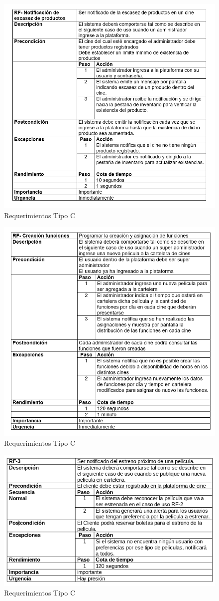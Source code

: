 \begin{figure}[h!]
\centering
\includegraphics[width=.8\linewidth]{diseno/requerimientos/imgs/casos1}
	\caption{Requerimientos Tipo C}
\end{figure}
\newpage
\begin{figure}[h!]
\centering
\includegraphics[width=.8\linewidth]{diseno/requerimientos/imgs/casos2}
	\caption{Requerimientos Tipo C}
\end{figure}
\newpage
\begin{figure}[h!]
\centering
\includegraphics[width=.8\linewidth]{diseno/requerimientos/imgs/casos3}
	\caption{Requerimientos Tipo C}
\end{figure}
